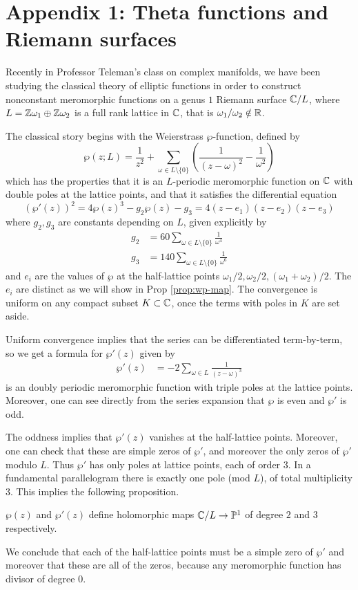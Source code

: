 \documentclass[12pt]{article}
\begin{document}
\section{Appendix 1: Theta functions and Riemann surfaces}
Recently in Professor Teleman's class on complex manifolds, we have been studying the classical theory of elliptic functions in order to construct nonconstant meromorphic functions on a genus $1$ Riemann surface $\mathbb{C}/L$, where $L = \mathbb{Z} \omega_1 \oplus \mathbb{Z} \omega_2$ is a full rank lattice in $\mathbb{C}$, that is $\omega_1/\omega_2 \notin \mathbb{R}$.

The classical story begins with the Weierstrass $\wp$-function, defined by
\[\wp(z;L) = \frac{1}{z^2} + \sum_{\omega \in L\setminus\{0\}} \left(\frac{1}{(z-\omega)^2} - \frac{1}{\omega^2}\right)\]
which has the properties that it is an $L$-periodic meromorphic function on $\mathbb{C}$ with double poles at the lattice points, and that it satisfies the differential equation
\[(\wp'(z))^2 = 4\wp(z)^3 - g_2\wp(z) - g_3 = 4(z - e_1)(z - e_2)(z - e_3)\]
where $g_2,g_3$ are constants depending on $L$, given explicitly by \begin{align*}
    g_2 & = 60\sum_{\omega \in L\setminus\{0\}} \frac{1}{\omega^4}  \\
    g_3 & = 140\sum_{\omega \in L\setminus\{0\}} \frac{1}{\omega^6}
\end{align*} and $e_i$ are the values of $\wp$ at the half-lattice points $\omega_1/2, \omega_2/2, (\omega_1+\omega_2)/2$. The $e_i$ are distinct as we will show in Prop \ref{prop:wp-map}.
The convergence is uniform on any compact subset $K \subset \mathbb{C}$, once the terms with poles in $K$ are set aside.

Uniform convergence implies that the series can be differentiated term-by-term, so we get a formula for $\wp'(z)$ given by \begin{align*}
    \wp'(z) & = -2\sum_{\omega \in L} \frac{1}{(z-\omega)^3}
\end{align*} is an doubly periodic meromorphic function with triple poles at the lattice points. Moreover, one can see directly from the series expansion that $\wp$ is even and $\wp'$ is odd.

The oddness implies that $\wp'(z)$ vanishes at the half-lattice points. Moreover, one can check that these are simple zeros of $\wp'$, and moreover the only zeros of $\wp'$ modulo $L$. Thus $\wp'$ has only poles at lattice points, each of order 3. In a fundamental parallelogram there is exactly one pole (mod $L$), of total multiplicity 3. This implies the following proposition.
\begin{proposition}
    $\wp(z)$ and $\wp'(z)$ define holomorphic maps $\mathbb{C}/L \to \mathbb{P}^1$ of degree $2$ and $3$ respectively.
\end{proposition}
We conclude that each of the half-lattice points must be a simple zero of $\wp'$ and moreover that these are all of the zeros, because any meromorphic function has divisor of degree 0.
\end{document}
